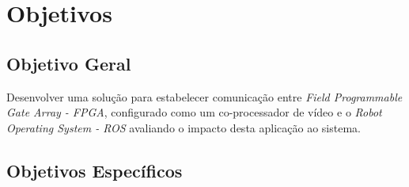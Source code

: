 


\section{Objetivos}

\subsection{Objetivo Geral}

Desenvolver uma solução para estabelecer comunicação entre \textit{Field Programmable Gate Array - FPGA}, 
configurado como um co-processador de vídeo e o  \textit{Robot Operating System - ROS} avaliando 
o impacto desta aplicação ao sistema.

\subsection{Objetivos Específicos}

